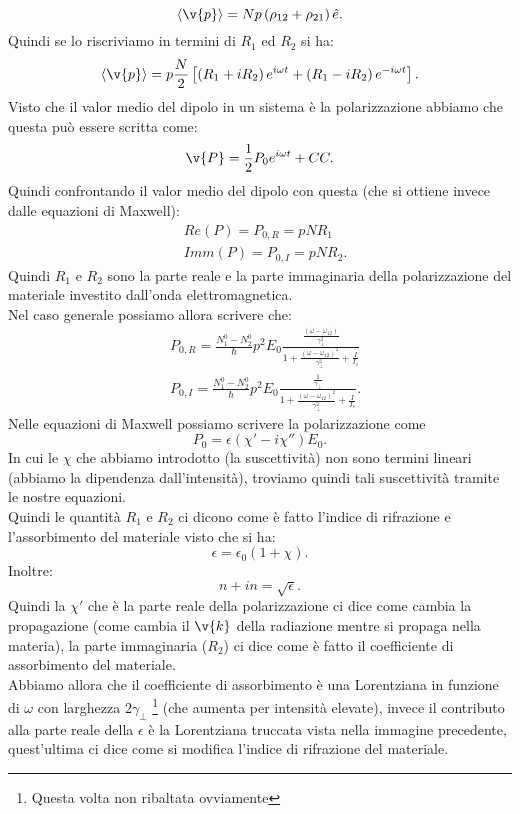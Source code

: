 \[
    \left<\v{p}\right> = Np\left(\rho_{12}+\rho_{21}\right)\hat{e}
.\] 
Quindi se lo riscriviamo in termini di $R_1$ ed $R_2$ si ha:
\[
    \left<\v{p}\right>= p \frac{N}{2} 
    \left[\left(R_1+iR_2\right)e^{i\omega t}
    +
    \left(R_1-iR_2\right)e^{-i\omega t}\right]
.\] 
Visto che il valor medio del dipolo in un sistema è la polarizzazione abbiamo che questa può essere scritta come:
\[
\v{P}= \frac{1}{2}P_0e^{i\omega t} + CC
.\] 
Quindi confrontando il valor medio del dipolo con questa (che si ottiene invece dalle equazioni di Maxwell):
\[\begin{aligned}
    &Re(P) =P_{0,R}= pN R_1\\
    &Imm(P) =P_{0,I}= pNR_2
.\end{aligned}\]
Quindi $R_1$ e $R_2$ sono la parte reale e la parte immaginaria della polarizzazione del materiale investito dall'onda elettromagnetica. \\
Nel caso generale possiamo allora scrivere che:
\[\begin{aligned}
    &P_{0,R} = \frac{N_1^0-N_2^0}{\hbar }p^2E_0 
    \frac{\frac{\left(\omega-\omega_{12}\right)}{\gamma_\perp^2}}
    {1+\frac{\left(\omega-\omega_{12}\right)^2}{\gamma_\perp^2}
    + \frac{I}{I_s}}\\
    &P_{0,I} = \frac{N_1^0-N_2^0}{\hbar }p^2E_0 
    \frac{\frac{1}{\gamma_\perp}}
    {1+\frac{\left(\omega-\omega_{12}\right)^2}{\gamma_\perp^2}
    + \frac{I}{I_s}}
.\end{aligned}\]
Nelle equazioni di Maxwell possiamo scrivere la polarizzazione come 
\[
    P_0 = \epsilon\left(\chi'-i\chi''\right)E_0
.\] 
In cui le $\chi$ che abbiamo introdotto (la suscettività) non sono termini lineari (abbiamo la dipendenza dall'intensità), troviamo quindi tali suscettività tramite le nostre equazioni.\\
Quindi le quantità $R_1$  e $R_2$   ci dicono come è fatto l'indice di rifrazione e l'assorbimento del materiale visto che si ha:
\[
    \epsilon = \epsilon_0\left(1+\chi\right)
.\] 
Inoltre:
\[
n+in = \sqrt{\epsilon} 
.\] 
Quindi la $\chi'$  che è la parte reale della polarizzazione ci dice come cambia la propagazione (come cambia il $\v{k}$ della radiazione mentre si propaga nella materia), la parte immaginaria ($R_2$) ci dice come è fatto il coefficiente di assorbimento del materiale. \\
Abbiamo allora che il coefficiente di assorbimento è una Lorentziana in funzione di $\omega$ con larghezza $2\gamma_\perp$
\footnote{Questa volta non ribaltata ovviamente} (che aumenta per intensità elevate), invece il contributo alla parte reale della $\epsilon$ è la Lorentziana truccata vista nella immagine precedente, quest'ultima ci dice come si modifica l'indice di rifrazione del materiale.\\
